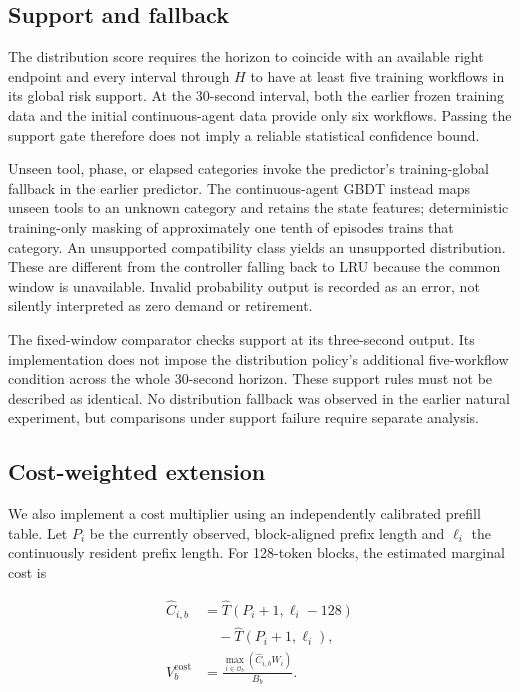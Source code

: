 \documentclass[sigconf, screen, review]{acmart}
\begin{document}
\subsection{Support and fallback}\label{support-and-fallback}

The distribution score requires the horizon to coincide with an
available right endpoint and every interval through \(H\) to have at
least five training workflows in its global risk support. At the
30-second interval, both the earlier frozen training data and the
initial continuous-agent data provide only six workflows.
Passing the support gate therefore does not imply a reliable statistical
confidence bound.

Unseen tool, phase, or elapsed categories invoke the predictor's
training-global fallback in the earlier predictor. The continuous-agent
GBDT instead maps unseen tools to an unknown category and retains the
state features; deterministic training-only masking of approximately
one tenth of episodes trains that category. An unsupported compatibility
class yields an unsupported distribution. These are different from the controller
falling back to LRU because the common window is unavailable. Invalid
probability output is recorded as an error, not silently interpreted as
zero demand or retirement.

The fixed-window comparator checks support at its three-second output.
Its implementation does not impose the distribution policy's additional
five-workflow condition across the whole 30-second horizon. These
support rules must not be described as identical. No distribution
fallback was observed in the earlier natural experiment, but
comparisons under support failure require separate analysis.

\subsection{Cost-weighted extension}\label{cost-weighted-extension}

We also implement a cost multiplier using an independently calibrated
prefill table. Let \(P_i\) be the currently observed, block-aligned
prefix length and \(\ell_i\) the continuously resident prefix length.
For 128-token blocks, the estimated marginal cost is

\[
\begin{aligned}
\widehat C_{i,b}&=\widehat T(P_i+1,\ell_i-128)\\
 &\quad-\widehat T(P_i+1,\ell_i),\\
V_b^{\mathrm{cost}}&=\frac{\max_{i\in\mathcal O_b}
 (\widehat C_{i,b}W_i)}{B_b}.
\end{aligned}
\]
\end{document}
